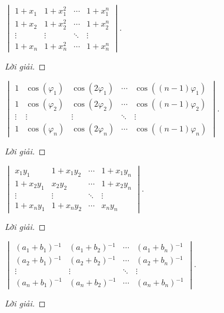 \documentclass[class=linearalgebra,crop=false]{standalone}
\begin{document}
\begin{exercise}
    $\begin{vmatrix}
        1 + x_{1} & 1 + x_{1}^{2} & \cdots & 1 + x_{1}^{n} \\
        1 + x_{2} & 1 + x_{2}^{2} & \cdots & 1 + x_{2}^{n} \\
        \vdots    & \vdots        & \ddots & \vdots        \\
        1 + x_{n} & 1 + x_{n}^{2} & \cdots & 1 + x_{n}^{n}
    \end{vmatrix}$.
\end{exercise}

\begin{proof}[Lời giải]
\end{proof}

\begin{exercise}
    $\begin{vmatrix}
        1      & \cos(\varphi_{1}) & \cos(2\varphi_{1}) & \cdots & \cos((n-1)\varphi_{1}) \\
        1      & \cos(\varphi_{2}) & \cos(2\varphi_{2}) & \cdots & \cos((n-1)\varphi_{2}) \\
        \vdots & \vdots            & \vdots             & \ddots & \vdots                 \\
        1      & \cos(\varphi_{n}) & \cos(2\varphi_{n}) & \cdots & \cos((n-1)\varphi_{n})
    \end{vmatrix}$.
\end{exercise}

\begin{proof}[Lời giải]
\end{proof}

\begin{exercise}
    $\begin{vmatrix}
        x_{1}y_{1}     & 1 + x_{1}y_{2} & \cdots & 1 + x_{1}y_{n} \\
        1 + x_{2}y_{1} & x_{2}y_{2}     & \cdots & 1 + x_{2}y_{n} \\
        \vdots         & \vdots         & \ddots & \vdots         \\
        1 + x_{n}y_{1} & 1 + x_{n}y_{2} & \cdots & x_{n}y_{n}
    \end{vmatrix}$.
\end{exercise}

\begin{proof}[Lời giải]
\end{proof}

\begin{exercise}
    $\begin{vmatrix}
        (a_{1} + b_{1}){}^{-1} & (a_{1} + b_{2}){}^{-1} & \cdots & (a_{1} + b_{n}){}^{-1} \\
        (a_{2} + b_{1}){}^{-1} & (a_{2} + b_{2}){}^{-1} & \cdots & (a_{2} + b_{n}){}^{-1} \\
        \vdots                 & \vdots                 & \ddots & \vdots                 \\
        (a_{n} + b_{1}){}^{-1} & (a_{n} + b_{2}){}^{-1} & \cdots & (a_{n} + b_{n}){}^{-1}
    \end{vmatrix}$.
\end{exercise}

\begin{proof}[Lời giải]
\end{proof}
\end{document}
